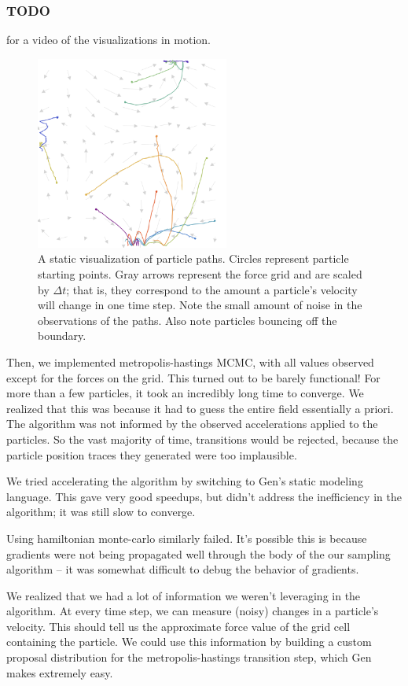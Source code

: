 \documentclass[11pt]{article}
\newcommand{\dt}[0]{\Delta t}
\begin{document}
\subsubsection{TODO}
\label{sec:org509e2cd}
for a video of the visualizations in motion.

\begin{figure}[htbp]
\centering
\includegraphics[width=2.5in]{./static.png}
\caption{\label{fig:static}A static visualization of particle paths. Circles represent particle starting points. Gray arrows represent the force grid and are scaled by \(\dt\); that is, they correspond to the amount a particle's velocity will change in one time step. Note the small amount of noise in the observations of the paths. Also note particles bouncing off the boundary.}
\end{figure}

Then, we implemented metropolis-hastings MCMC, with all values observed except for the forces on the grid. This turned out to be barely functional! For more than a few particles, it took an incredibly long time to converge. We realized that this was because it had to guess the entire field essentially a priori. The algorithm was not informed by the observed accelerations applied to the particles. So the vast majority of time, transitions would be rejected, because the particle position traces they generated were too implausible.

We tried accelerating the algorithm by switching to Gen's static modeling language. This gave very good speedups, but didn't address the inefficiency in the algorithm; it was still slow to converge.

Using hamiltonian monte-carlo similarly failed. It's possible this is because gradients were not being propagated well through the body of the our sampling algorithm -- it was somewhat difficult to debug the behavior of gradients.

We realized that we had a lot of information we weren't leveraging in the algorithm. At every time step, we can measure (noisy) changes in a particle's velocity. This should tell us the approximate force value of the grid cell containing the particle. We could use this information by building a custom proposal distribution for the metropolis-hastings transition step, which Gen makes extremely easy.
\end{document}
